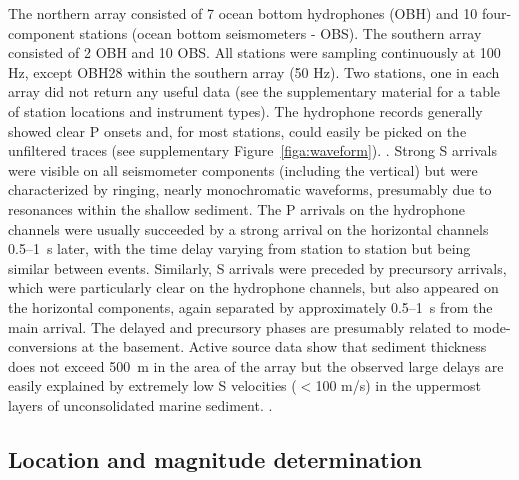 \documentclass[reviewcopy]{elsart}
\begin{document}
The northern array consisted of 7 ocean bottom hydrophones (OBH) and 10 four-component stations (ocean
bottom seismometers - OBS).
   The southern array consisted of 2 OBH and 10 OBS.  All stations
   were sampling continuously at 100 Hz, except OBH28 within the
   southern array (50 Hz). Two
   stations, one in each array did not return any useful data (see
   the supplementary material for a table of station locations and
   instrument types). 
   The hydrophone records generally showed clear
   P onsets and, for most stations, could easily be picked on
   the unfiltered traces (see  supplementary Figure~\ref{figa:waveform}). 
.  Strong S arrivals were visible on all
   seismometer components (including the vertical) but were
   characterized by ringing, nearly monochromatic waveforms, presumably due to resonances within the shallow
   sediment. The P arrivals on the hydrophone channels were usually
   succeeded by a strong arrival on the horizontal channels 0.5--1~s
   later, with the time delay varying from station to station but
   being similar between events.  Similarly, S arrivals were preceded
   by precursory arrivals, which were particularly clear on the hydrophone
   channels, but also appeared on the horizontal components, again
   separated by approximately 0.5--1~s from the main arrival.  The
   delayed and precursory phases are presumably related to
   mode-conversions at the basement. Active source data show that sediment
   thickness does not exceed 500~m in the area of the array
   \citep{ifmgeomar02} but the observed large delays are easily
   explained by extremely low S velocities ($<$100 m/s) in the
   uppermost layers of unconsolidated marine sediment. .  

\subsection{Location and magnitude determination}
\end{document}
